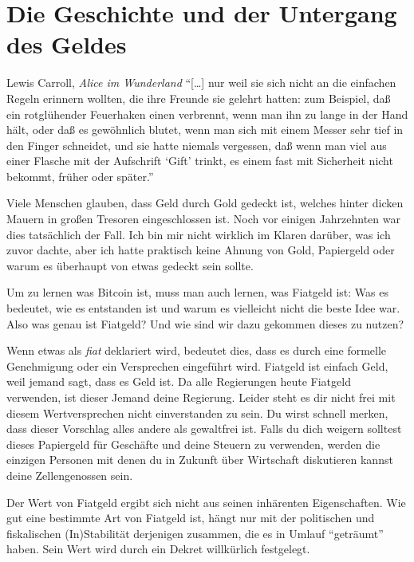 \chapter{Die Geschichte und der Untergang des Geldes}
\label{les:12}

\begin{chapquote}{Lewis Carroll, \textit{Alice im Wunderland}}
\enquote{[\ldots] nur weil sie sich nicht an die einfachen Regeln erinnern
wollten, die ihre Freunde sie gelehrt hatten: zum Beispiel, daß ein rotglühender
Feuerhaken einen verbrennt, wenn man ihn zu lange in der Hand hält, oder daß es
gewöhnlich blutet, wenn man sich mit einem Messer sehr tief in den Finger
schneidet, und sie hatte niemals vergessen, daß wenn man viel aus einer Flasche
mit der Aufschrift \enquote{Gift} trinkt, es einem fast mit Sicherheit nicht
bekommt, früher oder später.}
\end{chapquote}

Viele Menschen glauben, dass Geld durch Gold gedeckt ist, welches hinter dicken
Mauern in großen Tresoren eingeschlossen ist. Noch vor einigen Jahrzehnten war
dies tatsächlich der Fall. Ich bin mir nicht wirklich im Klaren darüber, was ich
zuvor dachte, aber ich hatte praktisch keine Ahnung von Gold, Papiergeld oder
warum es überhaupt von etwas gedeckt sein sollte.

Um zu lernen was Bitcoin ist, muss man auch lernen, was Fiatgeld ist: Was es
bedeutet, wie es entstanden ist und warum es vielleicht nicht die beste Idee
war. Also was genau ist Fiatgeld? Und wie sind wir dazu gekommen dieses zu
nutzen?

Wenn etwas als \textit{fiat} deklariert wird, bedeutet dies, dass es durch eine
formelle Genehmigung oder ein Versprechen eingeführt wird. Fiatgeld ist einfach
Geld, weil jemand sagt, dass es Geld ist. Da alle Regierungen heute Fiatgeld
verwenden, ist dieser Jemand deine Regierung. Leider steht es dir nicht frei mit
diesem Wertversprechen nicht einverstanden zu sein. Du wirst schnell merken,
dass dieser Vorschlag alles andere als gewaltfrei ist. Falls du dich weigern
solltest dieses Papiergeld für Geschäfte und deine Steuern zu verwenden, werden
die einzigen Personen mit denen du in Zukunft über Wirtschaft diskutieren
kannst deine Zellengenossen sein.

Der Wert von Fiatgeld ergibt sich nicht aus seinen inhärenten Eigenschaften. Wie
gut eine bestimmte Art von Fiatgeld ist, hängt nur mit der politischen und
fiskalischen (In)Stabilität derjenigen zusammen, die es in Umlauf
\enquote{geträumt} haben. Sein Wert wird durch ein Dekret willkürlich
festgelegt.

